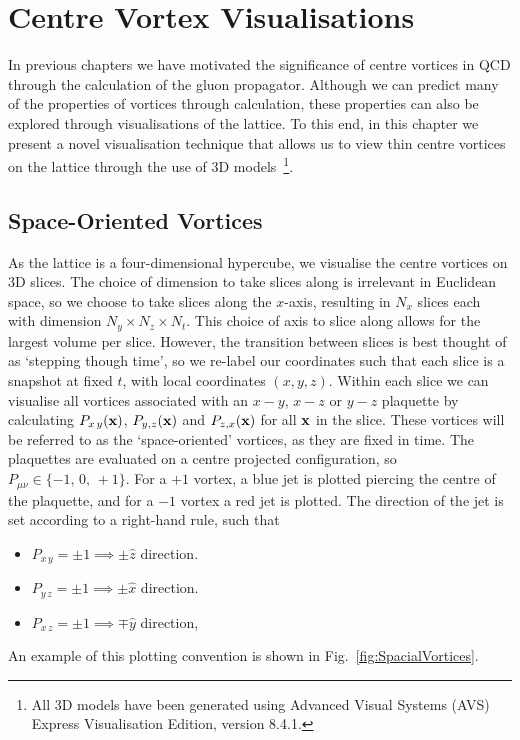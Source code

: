 
\chapter{Centre Vortex Visualisations}\label{chapter:Visualisations}
\ifpdf
    \graphicspath{{Chapter7/Figs/Raster/}{Chapter7/Figs/PDF/}{Chapter7/Figs/}}
\else
    \graphicspath{{Chapter7/Figs/Vector/}{Chapter7/Figs/}}
\fi

In previous chapters we have motivated the significance of centre vortices in QCD through the calculation of the gluon propagator. Although we can predict many of the properties of vortices through calculation, these properties can also be explored through visualisations of the lattice. To this end, in this chapter we present a novel visualisation technique that allows us to view thin centre vortices on the lattice through the use of 3D models~\footnote{All 3D models have been generated using Advanced Visual Systems (AVS) Express Visualisation Edition, version 8.4.1.}.

\section{Space-Oriented Vortices}
As the lattice is a four-dimensional hypercube, we visualise the centre vortices on 3D slices. The choice of dimension to take slices along is irrelevant in Euclidean space, so we choose to take slices along the $x$-axis, resulting in $N_x$ slices each with dimension $N_y\times N_z\times N_t$. This choice of axis to slice along allows for the largest volume per slice.  However, the transition between slices is best thought of as `stepping though time', so we re-label our coordinates such that each slice is a snapshot at fixed $t$, with local coordinates $(x,y,z)$. Within each slice we can visualise all vortices associated with an $x-y$, $x-z$ or $y-z$ plaquette by calculating $P_{x\,y}(\bf{x})$, $P_{y,z}(\bf{x})$ and $P_{z,x}(\bf{x})$ for all $\bf{x}$ in the slice. These vortices will be referred to as the `space-oriented' vortices, as they are fixed in time. The plaquettes are evaluated on a centre projected configuration, so $P_{\mu\nu}\in \lbrace -1,\,0,\,+1\rbrace$. For a $+1$ vortex, a blue jet is plotted piercing the centre of the plaquette, and for a $-1$ vortex a red jet is plotted. The direction of the jet is set according to a right-hand rule, such that
\begin{itemize}[leftmargin=*,itemsep=0pt,labelsep=12pt]
\item $P_{x\,y}=\pm 1\implies \pm\hat{z}$ direction.
\item $P_{y\,z}=\pm 1\implies \pm\hat{x}$ direction.
\item $P_{x\,z}=\pm 1\implies \mp\hat{y}$ direction,
\end{itemize}
An example of this plotting convention is shown in Fig.~\ref{fig:SpacialVortices}.\\

